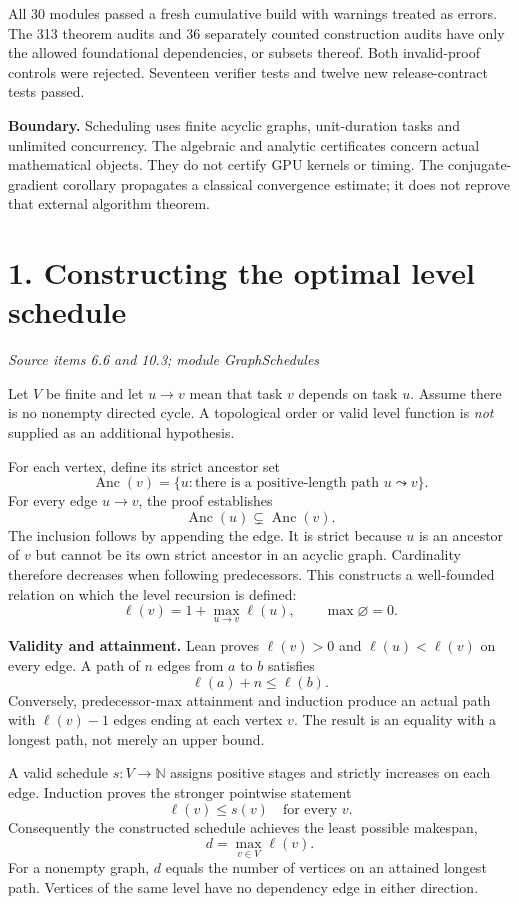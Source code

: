\documentclass[11pt]{article}
\newcommand{\pageheading}[2]{\section*{\color{ink}#1}\textit{#2}\par}
\begin{document}
All 30 modules passed a fresh cumulative build with warnings treated as errors. The 313 theorem audits and 36 separately counted construction audits have only the allowed foundational dependencies, or subsets thereof. Both invalid-proof controls were rejected. Seventeen verifier tests and twelve new release-contract tests passed.

\textbf{Boundary.} Scheduling uses finite acyclic graphs, unit-duration tasks and unlimited concurrency. The algebraic and analytic certificates concern actual mathematical objects. They do not certify GPU kernels or timing. The conjugate-gradient corollary propagates a classical convergence estimate; it does not reprove that external algorithm theorem.

\newpage
\pageheading{1. Constructing the optimal level schedule}{Source items 6.6 and 10.3; module GraphSchedules}
Let $V$ be finite and let $u\to v$ mean that task $v$ depends on task $u$. Assume there is no nonempty directed cycle. A topological order or valid level function is \emph{not} supplied as an additional hypothesis.

For each vertex, define its strict ancestor set
\[
\operatorname{Anc}(v)=\{u:\text{there is a positive-length path }u\leadsto v\}.
\]
For every edge $u\to v$, the proof establishes
\[
\operatorname{Anc}(u)\subsetneq\operatorname{Anc}(v).
\]
The inclusion follows by appending the edge. It is strict because $u$ is an ancestor of $v$ but cannot be its own strict ancestor in an acyclic graph. Cardinality therefore decreases when following predecessors. This constructs a well-founded relation on which the level recursion is defined:
\[
\boxed{\ell(v)=1+\max_{u\to v}\ell(u),\qquad \max\varnothing=0.}
\]

\textbf{Validity and attainment.} Lean proves $\ell(v)>0$ and $\ell(u)<\ell(v)$ on every edge. A path of $n$ edges from $a$ to $b$ satisfies
\[
\ell(a)+n\leq\ell(b).
\]
Conversely, predecessor-max attainment and induction produce an actual path with $\ell(v)-1$ edges ending at each vertex $v$. The result is an equality with a longest path, not merely an upper bound.

A valid schedule $s:V\to\mathbb N$ assigns positive stages and strictly increases on each edge. Induction proves the stronger pointwise statement
\[
\ell(v)\leq s(v)\quad\text{for every }v.
\]
Consequently the constructed schedule achieves the least possible makespan,
\[
\boxed{d=\max_{v\in V}\ell(v).}
\]
For a nonempty graph, $d$ equals the number of vertices on an attained longest path. Vertices of the same level have no dependency edge in either direction.
\end{document}
